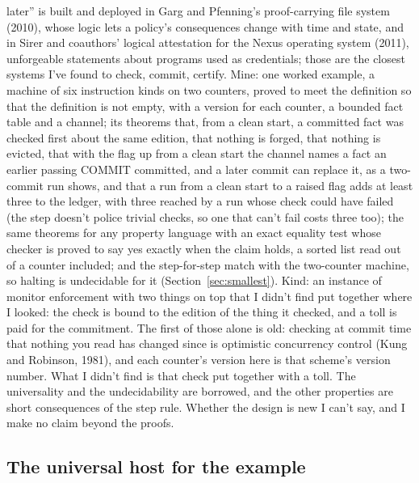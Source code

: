 \documentclass[11pt,twoside]{article}
\theoremstyle{thielethm}
\theoremstyle{thieledef}
\theoremstyle{thieledef}
\theoremstyle{thieledef}
\theoremstyle{thielethm}
\theoremstyle{thieleobs}
\theoremstyle{thielethm}
\begin{document}
later'' is built and deployed in Garg and Pfenning's proof-carrying file system (2010), whose
logic lets a policy's consequences change with time and state, and in Sirer and coauthors'
logical attestation for the Nexus operating system (2011), unforgeable statements about programs
used as credentials; those are the closest systems I've found to check, commit, certify. Mine: one worked example, a
machine of six instruction kinds on two counters, proved to meet the definition so that the definition is not empty, with a version
for each counter, a bounded fact table and a channel; its theorems that, from a clean start, a committed fact was checked
first about the same edition, that nothing is forged, that nothing is evicted,
that with the flag up from a clean start the channel names a fact an earlier passing COMMIT committed, and a later commit can replace it, as a two-commit run shows, and that a run from a clean start to a raised flag adds at least three to
the ledger, with three reached by a run whose check could have failed (the step doesn't
police trivial checks, so one that can't fail costs three too); the same theorems for any
property language with an exact equality
test whose checker is proved to say yes exactly when the claim holds, a sorted list read out of a
counter included; and the step-for-step match with
the two-counter machine, so halting is undecidable for it (Section~\ref{sec:smallest}).
Kind: an instance of monitor enforcement with two things on top
that I didn't find put together where I looked: the check is bound to the edition of the thing
it checked, and a toll is paid for the commitment. The first of those alone is old: checking at
commit time that nothing you read has changed since is optimistic concurrency control (Kung and
Robinson, 1981), and each counter's version here is that scheme's version number. What I didn't find is that
check put together with a toll. The universality and the
undecidability are borrowed, and the other properties are short consequences of the step
rule. Whether the design is new I can't say, and I make no claim beyond the proofs.

\subsection{The universal host for the example}
\end{document}
